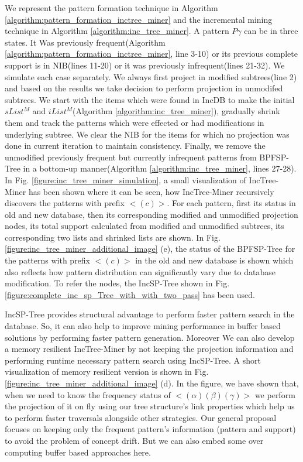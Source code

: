 We represent the pattern formation technique in Algorithm \ref{algorithm:pattern_formation_inctree_miner} and the incremental mining technique in Algorithm \ref{algorithm:inc_tree_miner}. A pattern $P\gamma$ can be in three states. It Was previously frequent(Algorithm \ref{algorithm:pattern_formation_inctree_miner}, line 3-10) or its previous complete support is in NIB(lines 11-20) or it  was previously infrequent(lines 21-32). We simulate each case separately. We always first project in modified subtrees(line 2) and based on the results we take decision to perform projection in unmodifed subtrees. We start with the items which were found in IncDB to make the initial $sList^{M}$ and $iList^{M}$(Algorithm \ref{algorithm:inc_tree_miner}), gradually shrink them and track the patterns which were effected or had modifications in underlying subtree. We clear the NIB for the items for which no projection was done in current iteration to maintain consistency. Finally, we remove the unmodified previously frequent but currently infrequent patterns from BPFSP-Tree in a bottom-up manner(Algorithm \ref{algorithm:inc_tree_miner}, lines 27-28). In Fig. \ref{figure:inc_tree_miner_simulation}, a small visualization of IncTree-Miner has been shown where it can be seen, how IncTree-Miner recursively discovers the patterns with prefix $< (c) >$. For each pattern, first its status in old and new database, then its corresponding modified and unmodified projection nodes, its total support calculated from modified and unmodified subtrees, its corresponding two lists and shrinked lists are shown. In Fig. \ref{figure:inc_tree_miner_additional_image} (e), the status of the BPFSP-Tree for the patterns with prefix $< (c) >$ in the old and new database is shown which also reflects how pattern distribution can significantly vary due to database modification. To refer the nodes, the IncSP-Tree shown in Fig. \ref{figure:complete_inc_sp_Tree_with_with_two_pass} has been used. 



IncSP-Tree provides structural advantage to perform faster pattern search in the database. So, it can also help to improve mining performance in buffer based solutions by performing faster pattern generation. Moreover We can also develop a memory resilient IncTree-Miner by not keeping the projection information and performing runtime necessary pattern search using IncSP-Tree. A short visualization of memory resilient version is shown in Fig. \ref{figure:inc_tree_miner_additional_image} (d). In the figure, we have shown that, when we need to know the frequency status of $< (\alpha)(\beta)(\gamma) >$ we perform the projection of it on fly using our tree structure's link properties which help us to perform faster traversals alongside other strategies. Our general proposal focuses on keeping only the frequent pattern's information (pattern and support) to avoid the problem of concept drift. But we can also embed some over computing buffer based approaches here.   



